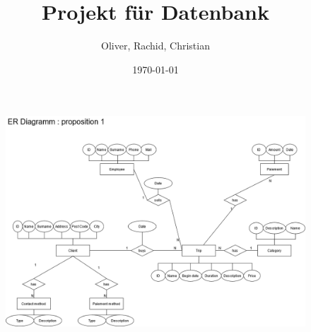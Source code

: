 \documentclass{article}
\title{Projekt für Datenbank}
\author{Oliver, Rachid, Christian}
\date{\today}
\begin{document}
	\maketitle
	
	\begin{figure}[htbp]
		\centering
			\includegraphics[width=1.00\textwidth]{../DB Projekt 1-ER-Model.png}
		\label{ER-Model}
	\end{figure}
	
\end{document}
